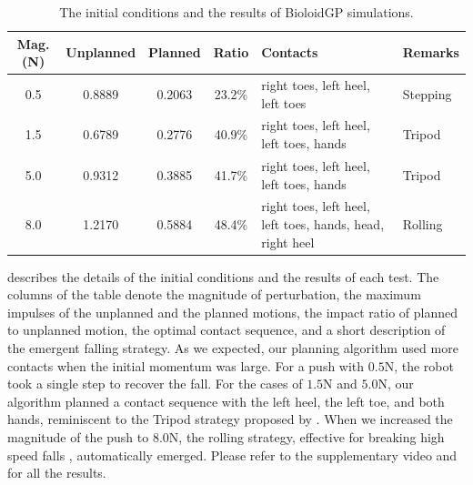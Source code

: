 \begin{table}
\scriptsize
\center
{
\caption{The initial conditions and the results of BioloidGP simulations.
}
\begin{tabular}{c |c c c|l | l}
\label{tab:falling_gp_results}
\\ \hline
Mag.(N) & Unplanned & Planned & Ratio & Contacts & Remarks \\ \hline
0.5 & 0.8889 & 0.2063 & 23.2\% & right toes, left heel, left toes & Stepping\\ \hline
1.5 & 0.6789 & 0.2776 & 40.9\% & right toes, left heel, left toes, hands & Tripod\\ \hline
5.0 & 0.9312 & 0.3885 & 41.7\% & right toes, left heel, left toes, hands & Tripod \\ \hline
8.0 & 1.2170 & 0.5884 & 48.4\% & right toes, left heel, left toes, hands, head, right heel & Rolling \\ \hline
\end{tabular}
}
\end{table}
 describes the details of the initial conditions
and the results of each test. The columns of the table denote the
magnitude of perturbation, the maximum impulses of the unplanned and
the planned motions, the impact ratio of planned to unplanned motion,
the optimal contact sequence, and a short description of the
emergent falling strategy. As we expected, our planning algorithm used more
contacts when the initial momentum was large. For a push with $0.5$N,
the robot took a single step to recover the fall. For the cases of
$1.5$N and $5.0$N, our algorithm planned a contact sequence with the
left heel, the left toe, and both hands, reminiscent to the Tripod strategy
proposed by \cite{Yun:2014:TFC}. When we increased the magnitude of the
push to $8.0$N, the rolling strategy, effective for breaking high
speed falls \cite{ZenpoUkemi:2014:URL}, automatically emerged. Please
refer to the supplementary video and  for all the
results.

